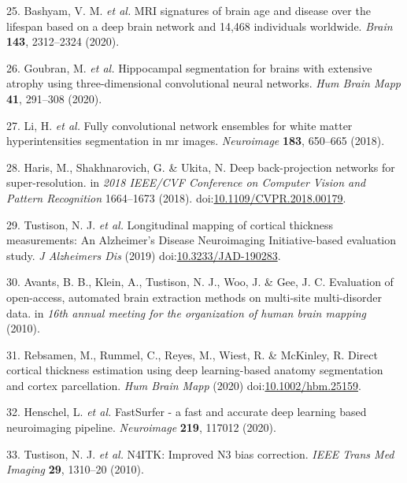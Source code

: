 \documentclass[12pt,]{article}
\begin{document}
\leavevmode\hypertarget{ref-Bashyam:2020aa}{}%
25. Bashyam, V. M. \emph{et al.} MRI signatures of brain age and disease
over the lifespan based on a deep brain network and 14,468 individuals
worldwide. \emph{Brain} \textbf{143}, 2312--2324 (2020).

\leavevmode\hypertarget{ref-Goubran:2020aa}{}%
26. Goubran, M. \emph{et al.} Hippocampal segmentation for brains with
extensive atrophy using three-dimensional convolutional neural networks.
\emph{Hum Brain Mapp} \textbf{41}, 291--308 (2020).

\leavevmode\hypertarget{ref-Li:2018aa}{}%
27. Li, H. \emph{et al.} Fully convolutional network ensembles for white
matter hyperintensities segmentation in mr images. \emph{Neuroimage}
\textbf{183}, 650--665 (2018).

\leavevmode\hypertarget{ref-Haris:2018aa}{}%
28. Haris, M., Shakhnarovich, G. \& Ukita, N. Deep back-projection
networks for super-resolution. in \emph{2018 IEEE/CVF Conference on
Computer Vision and Pattern Recognition} 1664--1673 (2018).
doi:\href{https://doi.org/10.1109/CVPR.2018.00179}{10.1109/CVPR.2018.00179}.

\leavevmode\hypertarget{ref-Tustison:2019aa}{}%
29. Tustison, N. J. \emph{et al.} Longitudinal mapping of cortical
thickness measurements: An Alzheimer's Disease Neuroimaging
Initiative-based evaluation study. \emph{J Alzheimers Dis} (2019)
doi:\href{https://doi.org/10.3233/JAD-190283}{10.3233/JAD-190283}.

\leavevmode\hypertarget{ref-Avants:2010ab}{}%
30. Avants, B. B., Klein, A., Tustison, N. J., Woo, J. \& Gee, J. C.
Evaluation of open-access, automated brain extraction methods on
multi-site multi-disorder data. in \emph{16th annual meeting for the
organization of human brain mapping} (2010).

\leavevmode\hypertarget{ref-Rebsamen:2020aa}{}%
31. Rebsamen, M., Rummel, C., Reyes, M., Wiest, R. \& McKinley, R.
Direct cortical thickness estimation using deep learning-based anatomy
segmentation and cortex parcellation. \emph{Hum Brain Mapp} (2020)
doi:\href{https://doi.org/10.1002/hbm.25159}{10.1002/hbm.25159}.

\leavevmode\hypertarget{ref-Henschel:2020aa}{}%
32. Henschel, L. \emph{et al.} FastSurfer - a fast and accurate deep
learning based neuroimaging pipeline. \emph{Neuroimage} \textbf{219},
117012 (2020).

\leavevmode\hypertarget{ref-Tustison:2010ac}{}%
33. Tustison, N. J. \emph{et al.} N4ITK: Improved N3 bias correction.
\emph{IEEE Trans Med Imaging} \textbf{29}, 1310--20 (2010).
\end{document}
